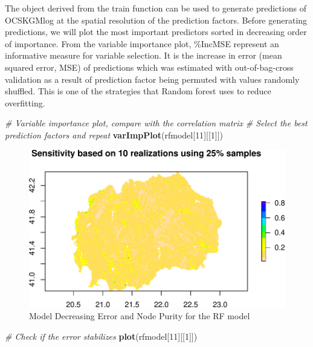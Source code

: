 \documentclass[10pt,b5paper,]{book}
\newenvironment{Shaded}{\begin{snugshade}}{\end{snugshade}}
\newcommand{\CommentTok}[1]{\textcolor[rgb]{0.56,0.35,0.01}{\textit{#1}}}
\newcommand{\DecValTok}[1]{\textcolor[rgb]{0.00,0.00,0.81}{#1}}
\newcommand{\KeywordTok}[1]{\textcolor[rgb]{0.13,0.29,0.53}{\textbf{#1}}}
\newcommand{\NormalTok}[1]{#1}
\theoremstyle{definition}
\theoremstyle{definition}
\theoremstyle{definition}
\theoremstyle{remark}
\begin{document}
The object derived from the train function can be used to generate
predictions of OCSKGMlog at the spatial resolution of the prediction
factors. Before generating predictions, we will plot the most important
predictors sorted in decreasing order of importance. From the variable
importance plot, \%IncMSE represent an informative measure for variable
selection. It is the increase in error (mean squared error, MSE) of
predictions which was estimated with out-of-bag-cross validation as a
result of prediction factor being permuted with values randomly
shuffled. This is one of the strategies that Random forest uses to
reduce overfitting.

\begin{Shaded}
\begin{Highlighting}[]
\CommentTok{# Variable importance plot, compare with the correlation matrix}
\CommentTok{# Select the best prediction factors and repeat  }
\KeywordTok{varImpPlot}\NormalTok{(rfmodel[}\DecValTok{11}\NormalTok{][[}\DecValTok{1}\NormalTok{]])}
\end{Highlighting}
\end{Shaded}

\begin{figure}
\centering
\includegraphics{SOCMapping_files/figure-latex/unnamed-chunk-62-1.pdf}
\caption{\label{fig:unnamed-chunk-62}Model Decreasing Error and Node Purity
for the RF model}
\end{figure}

\begin{Shaded}
\begin{Highlighting}[]
\CommentTok{# Check if the error stabilizes }
\KeywordTok{plot}\NormalTok{(rfmodel[}\DecValTok{11}\NormalTok{][[}\DecValTok{1}\NormalTok{]])}
\end{Highlighting}
\end{Shaded}
\end{document}
